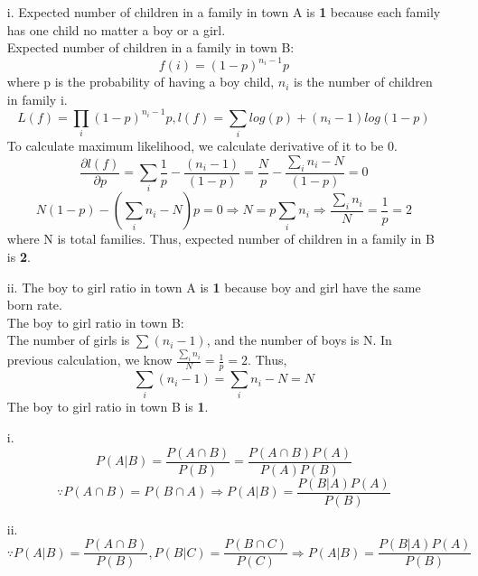 \item[(a)]
	\begin{itemize}  
	\item[i.]	
	Expected number of children in a family in town A is \textbf{1} because each family has one child no matter a boy or a girl.\\
	Expected number of children in a family in town B:
	\begin{equation*}
		f(i) = (1-p)^{n_i-1}p
	\end{equation*}
	where p is the probability of having a boy child, $n_i$ is the number of children in family i.
	\begin{equation*}
		L(f) = \prod_i (1-p)^{n_i-1}p, l(f)=\sum_i log(p)+(n_i-1)log(1-p)
	\end{equation*}
	To calculate maximum likelihood, we calculate derivative of it to be 0.
	\begin{equation*}
		\frac{\partial l(f)}{\partial p}= \sum_i \frac{1}{p}-\frac{(n_i-1)}{(1-p)}=\frac{N}{p}-\frac{\sum_in_i-N}{(1-p)}=0
	\end{equation*}
	\begin{equation*}
		N(1-p)-(\sum_in_i-N)p=0\Rightarrow N = p\sum_in_i \Rightarrow \frac{\sum_in_i}{N} = \frac{1}{p} = 2
	\end{equation*}
	where N is total families. Thus, expected number of children in a family in B is \textbf{2}.  
	\item[ii.]
	The boy to girl ratio in town A is \textbf{1} because boy and girl have the same born rate. \\ 
	The boy to girl ratio in town B:\\
	The number of girls is $\sum (n_i-1)$, and the number of boys is N.	
	In previous calculation, we know $\frac{\sum_in_i}{N} = \frac{1}{p} = 2$. Thus,
	\begin{equation*}
		\sum_i( n_i-1 )=  \sum_in_i - N = N
	\end{equation*}
	The boy to girl ratio in town B is \textbf{1}.
	\end{itemize}
\item[(b)]
	\begin{itemize}  
	\item[i.]
	\begin{equation*}
		P(A|B)=\frac{P(A \cap B)}{P(B)} = \frac{P(A \cap B)P(A)}{P(A)P(B)} 
	\end{equation*}	
	\begin{equation*}
		\because P(A \cap B) = P(B \cap A) \Rightarrow P(A|B) = \frac{P(B|A)P(A)}{P(B)}
	\end{equation*}
	\item[ii.]
	\begin{equation*}
		\because P(A|B) = \frac{P(A \cap B)}{P(B)}, P(B|C) = \frac{P(B\cap C)}{P(C)} \Rightarrow P(A|B) = \frac{P(B|A)P(A)}{P(B)}
	\end{equation*}

	\end{itemize}

